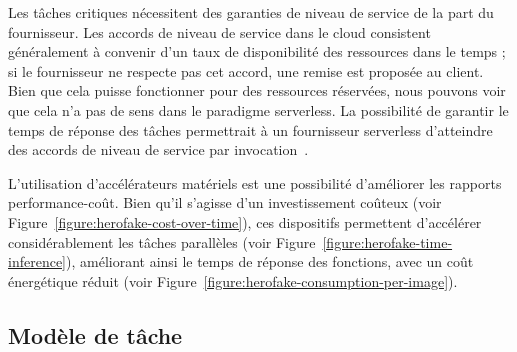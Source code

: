 Les tâches critiques nécessitent des garanties de niveau de service de la part du fournisseur. Les accords de niveau de service dans le cloud consistent généralement à convenir d'un taux de disponibilité des ressources dans le temps ; si le fournisseur ne respecte pas cet accord, une remise est proposée au client. Bien que cela puisse fonctionner pour des ressources réservées, nous pouvons voir que cela n'a pas de sens dans le paradigme serverless. La possibilité de garantir le temps de réponse des tâches permettrait à un fournisseur serverless d'atteindre des accords de niveau de service par invocation~\cite{zhangMArkExploitingCloud}.

L'utilisation d'accélérateurs matériels est une possibilité d'améliorer les rapports performance-coût. Bien qu'il s'agisse d'un investissement coûteux (voir Figure~\ref{figure:herofake-cost-over-time}), ces dispositifs permettent d'accélérer considérablement les tâches parallèles (voir Figure~\ref{figure:herofake-time-inference}), améliorant ainsi le temps de réponse des fonctions, avec un coût énergétique réduit (voir Figure~\ref{figure:herofake-consumption-per-image}).

\subsection{Modèle de tâche} \label{model:tasks}

